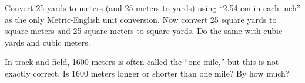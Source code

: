 \begin{prob}
Convert 25 yards to meters (and 25 meters to yards) using ``2.54 cm in each inch'' as the only Metric-English unit conversion.  Now convert 25 square yards to square meters and 25 square meters to square yards.  Do the same with cubic yards and cubic meters.
\end{prob}

\begin{prob}
In track and field, 1600 meters is often called the ``one mile,'' but this is not exactly correct.  Is 1600 meters longer or shorter than one mile?  By how much?  
\end{prob}


%
%
%


